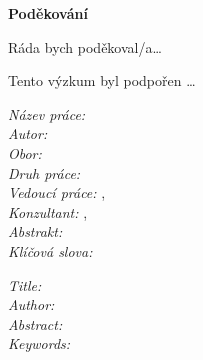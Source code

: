 {\bf \noindent Poděkování} 

\vspace{0.5cm} 
\noindent Ráda bych poděkoval/a\dots

Tento výzkum byl podpořen \dots

\begin{flushright}
\autor
\end{flushright} 

\newpage
\thispagestyle{empty}

{
	\setlength{\parindent}{0pt}
	
	\textit{Název práce:}
	\textbf{\nazevcz} \\
	
	\textit{Autor:} \autor \\
	
	\textit{Obor:} \obor \\
	
	\textit{Druh práce:} \typprace \\
	
	\textit{Vedoucí práce:}  \vedouci, \pracoviste \\
	
	\textit{Konzultant:}  \konzultant, \pracovistek \\ 
	
	\textit{Abstrakt:} 
	\abstrCZ \\
	
	\textit{Klíčová slova:}  \klicova
}

\newpage
\thispagestyle{empty}
{
	\setlength{\parindent}{0pt}
\textit{Title:}
\textbf{\nazeven} \\

\textit{Author:} \autor \\

\textit{Abstract:} 
\abstrEN \\

\textit{Keywords:}  \keywords
}
